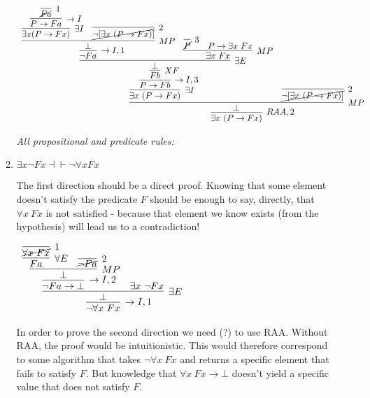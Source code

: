 \documentclass[11pt]{report}
\begin{document}
\begin{enumerate}
\begin{enumerate}
					\begin{center}
						$\begin{array}{c}
							\infer[RAA,2]{\exists x \ (P \to Fx)}
								{\infer[MP]{\bot}
									{\infer[\exists I]{\exists x \ (P \to Fx)}
										{\infer[\to I,3]{P \to Fb}
											{\infer[XF]{Fb}
												{\infer[\exists E]{\bot}
													{\infer[\to I,1]{\lnot Fa}
														{\infer[MP]{\bot}
															{\infer[\exists I]{\exists x (P \to Fx)}
																{\infer[\to I]{P \to Fa}
																	{\infer[1]{\cancel{Fa}}{}}}
															&
															\infer[2]{\cancel{\lnot[\exists x \ (P \to Fx)]}}{}}}
													&
													\infer[MP]{\exists x \ Fx}
														{\infer[3]{\cancel{P}}{}
														&
														P \to \exists x \ Fx}}}}}
									&
									\infer[2]{\cancel{\lnot[\exists x \ (P \to Fx)]}}{}}}
						\end{array}$
					\end{center}
			
			\newpage
			\emph{All propositional and predicate rules:}

			\item $\exists x \neg Fx \dashv \vdash  \neg  \forall x Fx$
			
					The first direction should be a direct proof. Knowing that some element doesn't satisfy the predicate $F$ should be enough to say, directly, that $\forall x \ Fx$ is not satisfied - because that element we know exists (from the hypothesis) will lead us to a contradiction! 

					\begin{mdframed}
						\begin{center}
							$\begin{array}{c}
								\infer[\to I,1]{\lnot \forall x \ Fx}
									{\infer[\exists E]{\bot}
										{\infer[\to I,2]{\lnot Fa \to \bot}
											{\infer[MP]{\bot}
												{\infer[\forall E]{Fa}
													{\infer[1]{\cancel{\forall x \ Fx}}
														{}}
												&
												\infer[2]{\cancel{\lnot Fa}}{}}}
										&
										\exists x \ \lnot Fx}}
							\end{array}$
						\end{center}
					\end{mdframed}

					In order to prove the second direction we need (?) to use RAA. Without RAA, the proof would be intuitionistic. This would therefore correspond to some algorithm that takes $\lnot \forall x \ Fx$ and returns a specific element that fails to satisfy $F$. But knowledge that $\forall x \ Fx \to \bot$ doesn't yield a specific value that does not satisfy $F$. 


\end{enumerate}
\end{enumerate}
\end{document}
